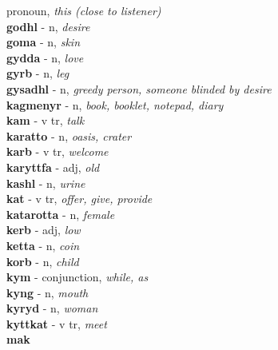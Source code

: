 pronoun, \emph{this (close to listener)}\\ \vspace{7pt}\textbf{godhl}   - n, \emph{desire}\\ \vspace{7pt}\textbf{goma}   - n, \emph{skin}\\ \vspace{7pt}\textbf{gydda}   - n, \emph{love}\\ \vspace{7pt}\textbf{gyrb}   - n, \emph{leg}\\ \vspace{7pt}\textbf{gysadhl}   - n, \emph{greedy person, someone blinded by desire}\\ \vspace{7pt}\textbf{kagmenyr}   - n, \emph{book, booklet, notepad, diary}\\ \vspace{7pt}\textbf{kam}   - v tr, \emph{talk}\\ \vspace{7pt}\textbf{karatto}   - n, \emph{oasis, crater}\\ \vspace{7pt}\textbf{karb}   - v tr, \emph{welcome}\\ \vspace{7pt}\textbf{karyttfa}   - adj, \emph{old}\\ \vspace{7pt}\textbf{kashl}   - n, \emph{urine}\\ \vspace{7pt}\textbf{kat}   - v tr, \emph{offer, give, provide}\\ \vspace{7pt}\textbf{katarotta}   - n, \emph{female}\\ \vspace{7pt}\textbf{kerb}   - adj, \emph{low}\\ \vspace{7pt}\textbf{ketta}   - n, \emph{coin}\\ \vspace{7pt}\textbf{korb}   - n, \emph{child}\\ \vspace{7pt}\textbf{kym}   - conjunction, \emph{while, as}\\ \vspace{7pt}\textbf{kyng}   - n, \emph{mouth}\\ \vspace{7pt}\textbf{kyryd}   - n, \emph{woman}\\ \vspace{7pt}\textbf{kyttkat}   - v tr, \emph{meet}\\ \vspace{7pt}\textbf{mak} 